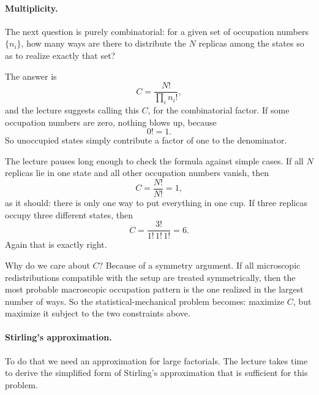 \paragraph{Multiplicity.}

The next question is purely combinatorial: for a given set of occupation numbers \(\{n_i\}\), how many ways are there to distribute the \(N\) replicas among the states so as to realize exactly that set?

The answer is
\begin{equation}
C=\frac{N!}{\prod_i n_i!},
\end{equation}
and the lecture suggests calling this \(C\), for the combinatorial factor. If some occupation numbers are zero, nothing blows up, because
\begin{equation}
0!=1.
\end{equation}
So unoccupied states simply contribute a factor of one to the denominator.

The lecture pauses long enough to check the formula against simple cases. If all \(N\) replicas lie in one state and all other occupation numbers vanish, then
\begin{equation}
C=\frac{N!}{N!}=1,
\end{equation}
as it should: there is only one way to put everything in one cup. If three replicas occupy three different states, then
\begin{equation}
C=\frac{3!}{1!\,1!\,1!}=6.
\end{equation}
Again that is exactly right.

Why do we care about \(C\)? Because of a symmetry argument. If all microscopic redistributions compatible with the setup are treated symmetrically, then the most probable macroscopic occupation pattern is the one realized in the largest number of ways. So the statistical-mechanical problem becomes: maximize \(C\), but maximize it subject to the two constraints above.

\paragraph{Stirling's approximation.}

To do that we need an approximation for large factorials. The lecture takes time to derive the simplified form of Stirling's approximation that is sufficient for this problem.

